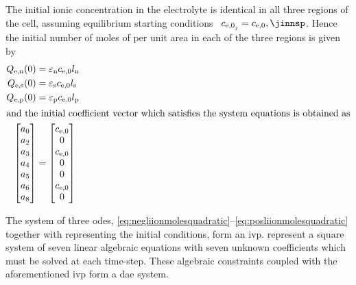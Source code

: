 The  initial   ionic  concentration   in  the   electrolyte  is   identical  in
all  three  regions  of  the  cell,  assuming  equilibrium  starting  conditions
\ie~${c_{\text{e,0}_j}  = c_\text{e,0},  \jinnsp}$.  Hence the  initial number  of
moles of  per unit area in each of the three regions is given by
\begin{align}
    Q_\text{e,n}(0) & = \varepsilon_\text{n} c_\text{e,0} l_\text{n} \label{eq:Qeninit}\\
    Q_\text{e,s}(0) & = \varepsilon_\text{s} c_\text{e,0} l_\text{s}\\
    Q_\text{e,p}(0) & = \varepsilon_\text{p} c_\text{e,0} l_\text{p} \label{eq:Qepinit}\\
    \shortintertext{and the initial coefficient vector which satisfies the system
    equations is obtained as}
    \begin{bmatrix}
        a_0 \\
        a_2 \\
        a_3 \\
        a_4 \\
        a_5 \\
        a_6 \\
        a_8
        \end{bmatrix} & = \begin{bmatrix}
        c_\text{e,0} \\
        0 \\
        c_\text{e,0} \\
        0 \\
        0 \\
        c_\text{e,0} \\
        0
    \end{bmatrix} \label{eq:coeffinit}
\end{align}

The             system             of             three             \glspl{ode},
\eqref{eq:negliionmolesquadratic}--\eqref{eq:posliionmolesquadratic}    together
with    representing the  initial  conditions,
form   an    \gls{ivp}.   
represent a square system of seven linear algebraic equations with seven unknown
coefficients which must be solved at each time-step. These algebraic constraints
coupled with the aforementioned \gls{ivp} form a \gls{dae} system.

